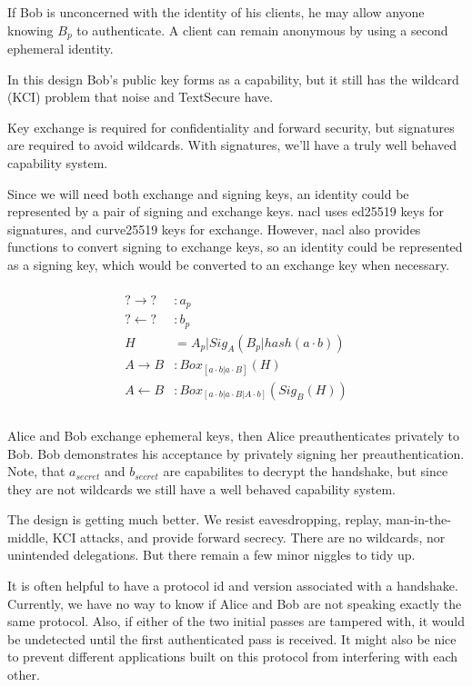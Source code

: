 \documentclass[12pt]{article}
\begin{document}
If Bob is unconcerned with the identity of his clients,
he may allow anyone knowing $B_p$ to authenticate. A client can
remain anonymous by using a second ephemeral identity.

In this design Bob's public key forms as a capability,
but it still has the wildcard (KCI) problem that
noise and TextSecure have.

Key exchange is required for confidentiality and
forward security, but signatures are required to avoid wildcards.
With signatures, we'll have a truly well behaved capability system.

Since we will need both exchange and signing keys,
an identity could be represented by a pair of signing and exchange keys.
nacl uses ed25519 keys for signatures, and
curve25519 keys for exchange. However, nacl also provides
functions to convert signing to exchange keys,
so an identity could be represented as a signing key,
which would be converted to an exchange key when necessary.

$$
\begin{align*}
\\
    ? \to ? &: a_p   \\
    ? \gets ? &: b_p \\
    H &= A_{p}|Sig_A(B_p|hash(a \cdot b)) \\
    A \to B &: Box_{[a \cdot b | a \cdot B]}(H)\\
    A \gets B &: Box_{[a \cdot b | a \cdot B | A \cdot b]}(Sig_B(H) )\\
\\
\end{align*}
$$

Alice and Bob exchange ephemeral keys, then Alice
preauthenticates privately to Bob. Bob demonstrates his acceptance
by privately signing her preauthentication.
Note, that $a_{secret}$ and $b_{secret}$ are capabilites to decrypt
the handshake, but since they are not wildcards we still have a well
behaved capability system.

The design is getting much better. We resist eavesdropping, replay,
man-in-the-middle, KCI attacks, and provide forward secrecy.
There are no wildcards, nor unintended delegations.
But there remain a few minor niggles to tidy up.

It is often helpful to have a protocol id and version associated
with a handshake. Currently, we have no way to know if Alice and
Bob are not speaking exactly the same protocol.
Also, if either of the two initial passes are tampered with, it would
be undetected until the first authenticated pass is received.
It might also be nice to prevent different applications
built on this protocol from interfering with each other.
\end{document}
